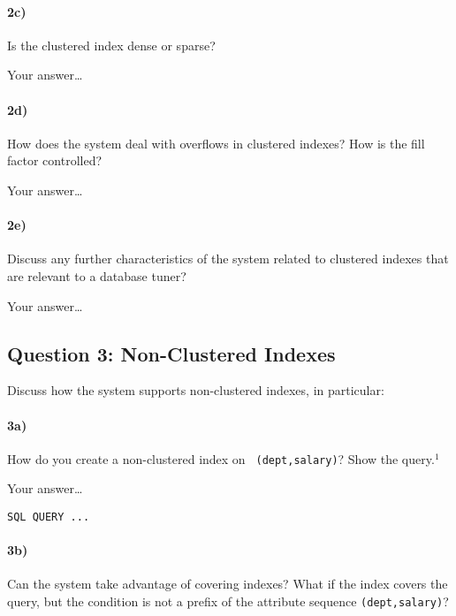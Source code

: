 \documentclass[11pt]{scrartcl}
\begin{document}
\paragraph{2c)} Is the clustered index dense or sparse?


\smallskip

Your answer\dots

\paragraph{2d)} How does the system deal with overflows in clustered indexes?
How is the fill factor controlled?

\smallskip

Your answer\dots

\paragraph{2e)} Discuss any further characteristics of the system
related to clustered indexes that are relevant to a database
tuner?

\smallskip

Your answer\dots

\subsection*{Question 3: Non-Clustered Indexes}

Discuss how the system supports non-clustered indexes, in
particular:

\paragraph{3a)} How do you create a non-clustered index on {\tt
  (dept,salary)}? Show the query.$^1$

\smallskip

Your answer\dots

{\small
\begin{verbatim}
SQL QUERY ...
\end{verbatim}
}

\paragraph{3b)} Can the system take advantage of covering indexes? What if the
index covers the query, but the condition is not a prefix of the
attribute sequence {\tt (dept,salary)}?


\smallskip
\end{document}
